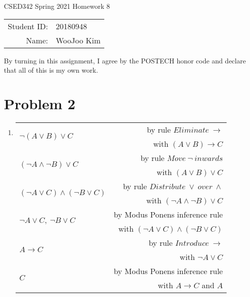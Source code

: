 \documentclass[12pt]{article}
\begin{document}
\begin{center}
{\Large CSED342 Spring 2021 Homework 8 \vspace{10pt}}

\begin{tabular}{rl}
Student ID: & 20180948 \\
Name: & WooJoo Kim \\
\end{tabular}
\end{center}

By turning in this assignment, I agree by the POSTECH honor code and declare that all of this is my own work.

\section*{Problem 2}

\begin{enumerate}[label=(\alph*)]
    \item
    \begin{tabular}{lr}
    \multirow{2}{*}{$\lnot (A \lor B) \lor C$}                 & by rule $Eliminate \ \to$ \\
                                                               & with $(A \lor B) \to C$ \\
    \multirow{2}{*}{$(\lnot A \land \lnot B) \lor C$}          & by rule $Move \ \lnot \ inwards$ \\
                                                               & with $(A \lor B) \lor C$ \\
    \multirow{2}{*}{$(\lnot A \lor C) \land (\lnot B \lor C)$} & by rule $Distribute \ \lor \ over \ \land$ \\
                                                               & with $(\lnot A \land \lnot B) \lor C$ \\
    \multirow{2}{*}{$\lnot A \lor C,\ \lnot B \lor C$}         & by Modus Ponens inference rule \\
                                                               & with $(\lnot A \lor C) \land (\lnot B \lor C)$ \\
    \multirow{2}{*}{$A \to C$}                                 & by rule $Introduce \ \to$ \\
                                                               & with $\lnot A \lor C$ \\
    \multirow{2}{*}{$C$}                                       & by Modus Ponens inference rule \\
                                                               & with $A \to C$ and $A$
    \end{tabular}


\end{enumerate}
\end{document}

